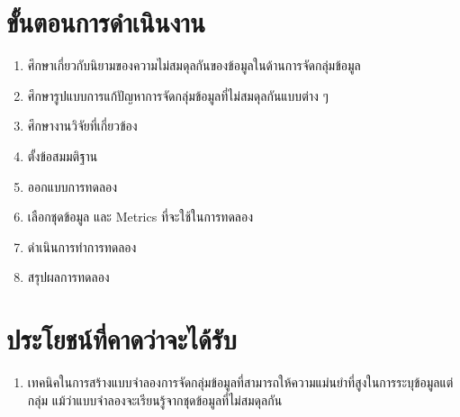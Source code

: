 \section{ขั้นตอนการดำเนินงาน}
\begin{enumerate}
	\item ศึกษาเกี่ยวกับนิยามของความไม่สมดุลกันของข้อมูลในด้านการจัดกลุ่มข้อมูล
	\item ศึกษารูปแบบการแก้ปัญหาการจัดกลุ่มข้อมูลที่ไม่สมดุลกันแบบต่าง ๆ
	\item ศึกษางานวิจัยที่เกี่ยวข้อง
	\item ตั้งข้อสมมติฐาน
	\item ออกแบบการทดลอง
	\item เลือกชุดข้อมูล และ Metrics ที่จะใช้ในการทดลอง
	\item ดำเนินการทำการทดลอง
	\item สรุปผลการทดลอง
\end{enumerate}
\section{ประโยชน์ที่คาดว่าจะได้รับ}
\begin{enumerate}
	\item เทคนิคในการสร้างแบบจำลองการจัดกลุ่มข้อมูลที่สามารถให้ความแม่นยำที่สูงในการระบุข้อมูลแต่กลุ่ม แม้ว่าแบบจำลองจะเรียนรู้จากชุดข้อมูลที่ไม่สมดุลกัน
\end{enumerate}


